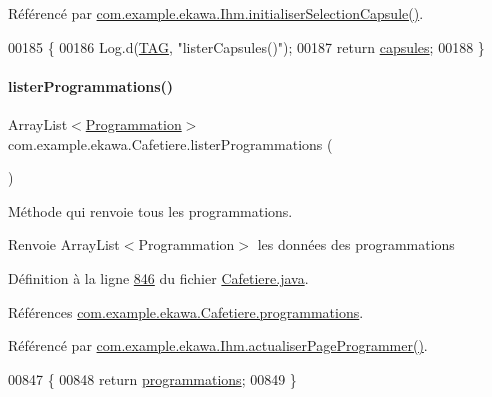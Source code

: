 Référencé par \hyperlink{_ihm_8java_source_l00413}{com.\+example.\+ekawa.\+Ihm.\+initialiser\+Selection\+Capsule()}.


\begin{DoxyCode}
00185     \{
00186         Log.d(\hyperlink{classcom_1_1example_1_1ekawa_1_1_cafetiere_aa0c1fd99a2508b06c462aea17034aa91}{TAG}, \textcolor{stringliteral}{"listerCapsules()"});
00187         \textcolor{keywordflow}{return} \hyperlink{classcom_1_1example_1_1ekawa_1_1_cafetiere_ae9590789503a6ae2094c86cf93299821}{capsules};
00188     \}
\end{DoxyCode}
\mbox{\label{classcom_1_1example_1_1ekawa_1_1_cafetiere_af82120eee3f2f7dbb28f74e663bfe15a}} 
\paragraph{\texorpdfstring{lister\+Programmations()}{listerProgrammations()}}
{\footnotesize\ttfamily Array\+List$<$\hyperlink{classcom_1_1example_1_1ekawa_1_1_programmation}{Programmation}$>$ com.\+example.\+ekawa.\+Cafetiere.\+lister\+Programmations (\begin{DoxyParamCaption}{ }\end{DoxyParamCaption})}



Méthode qui renvoie tous les programmations. 

\begin{DoxyReturn}{Renvoie}
Array\+List$<$\+Programmation$>$ les données des programmations 
\end{DoxyReturn}


Définition à la ligne \hyperlink{_cafetiere_8java_source_l00846}{846} du fichier \hyperlink{_cafetiere_8java_source}{Cafetiere.\+java}.



Références \hyperlink{_cafetiere_8java_source_l00083}{com.\+example.\+ekawa.\+Cafetiere.\+programmations}.



Référencé par \hyperlink{_ihm_8java_source_l00938}{com.\+example.\+ekawa.\+Ihm.\+actualiser\+Page\+Programmer()}.


\begin{DoxyCode}
00847     \{
00848         \textcolor{keywordflow}{return} \hyperlink{classcom_1_1example_1_1ekawa_1_1_cafetiere_a987c8e1bcea506b65f4b05f955b3f699}{programmations};
00849     \}
\end{DoxyCode}
\mbox{\label{classcom_1_1example_1_1ekawa_1_1_cafetiere_ae15274dce04b0f875727b29e573fc83f}} 
